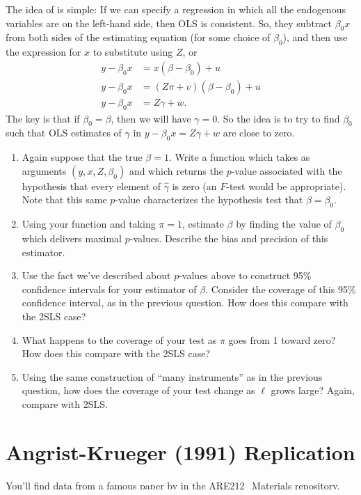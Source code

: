 \documentclass[12pt]{amsart}
\begin{document}
The idea of \citeauthor{chernozhukov-hansen08} is simple: If we can specify a regression in which all the endogenous variables are on the left-hand side, then OLS is consistent.  So, they subtract \(\beta_0 x\) from both sides of the estimating equation (for some choice of \(\beta_0\)), and then use the expression for \(x\) to substitute using \(Z\), or
\begin{align*}
y - \beta_0x &= x(\beta-\beta_0) + u \\
y - \beta_0x &= (Z\pi + v)(\beta-\beta_0) + u \\
y - \beta_0x &= Z\gamma  + w.
\end{align*}
The key is that if \(\beta_0=\beta\), then we will have \(\gamma=0\).  So the idea is to try to find \(\beta_0\) such that OLS estimates of \(\gamma\) in \(y-\beta_0x = Z\gamma + w\) are close to zero.

\begin{enumerate}
\item Again suppose that the true \(\beta=1\).  Write a function which takes as arguments \((y,x,Z,\beta_0)\) and which returns the \(p\)-value associated with the hypothesis that every element of \(\hat{\gamma}\) is zero (an \(F\)-test would be appropriate).  Note that this same \(p\)-value characterizes the hypothesis test that \(\beta=\beta_0\).

\item Using your function and taking \(\pi=1\), estimate \(\beta\) by finding the value of \(\beta_0\) which delivers maximal \(p\)-values.  Describe the bias and precision of this estimator.

\item Use the fact we've described about \(p\)-values above to construct 95\% confidence intervals for your estimator of \(\beta\).  Consider the coverage of this 95\% confidence interval, as in the previous question.  How does this compare with the 2SLS case?

\item What happens to the coverage of your test as \(\pi\) goes from 1 toward zero?  How does this compare with the 2SLS case?

\item Using the same construction of ``many instruments'' as in the previous question, how does the coverage of your test change as \(\ell\) grows large?  Again, compare with 2SLS.
\end{enumerate}
\section{Angrist-Krueger (1991) Replication}
\label{sec:org4211778}
You'll find \href{https://github.com/ligonteaching/ARE212\_Materials/blob/master/angrist-krueger91.dta}{data} from a famous paper by \textcite{angrist-krueger91} in
the ARE212\_Materials repository, along with a \href{https://github.com/ligonteaching/ARE212\_Materials/blob/master/angrist\_krueger91.pdf}{pdf} of the paper.  The
paper uses information on ``quarter of birth'' as an instrument for
(endogenous) education to measure returns to education.
\end{document}
